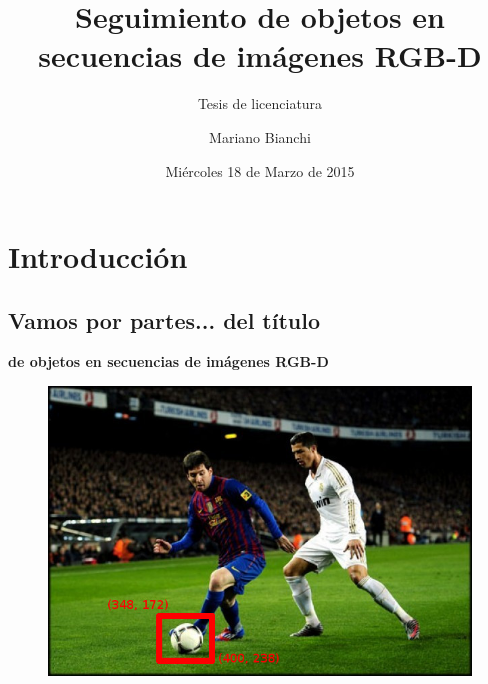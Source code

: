\documentclass[]{beamer}
\title{Seguimiento de objetos en secuencias de imágenes RGB-D}
\subtitle{Tesis de licenciatura}
\institute{Facultad de Ciencias Exactas y Naturales}
\date[18/03/15]{Miércoles 18 de Marzo de 2015}
\author{Mariano Bianchi}
\begin{document}
\maketitle

\section{Introducción}
%

\subsection{Vamos por partes... del título}
\begin{frame}{}
    \textbf{ de objetos en secuencias de imágenes RGB-D}
    \begin{figure}[t]
        \centering
        \includegraphics[scale=0.45]{img/seguimiento_ejemplo.jpg}
    \end{figure}
\end{frame}
\end{document}
